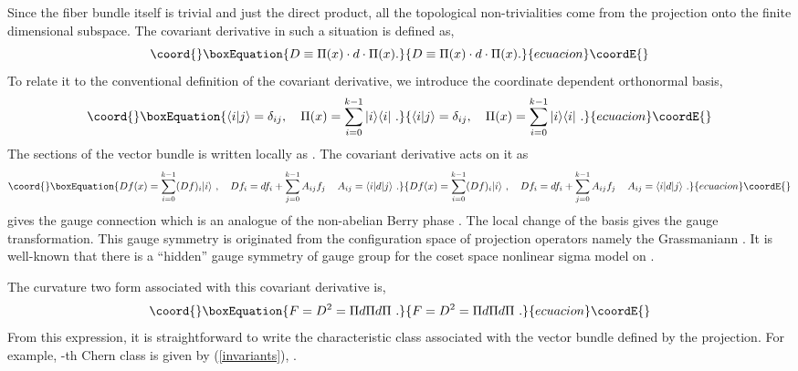 \documentclass[a4paper,12pt]{article}
\begin{document}
Since the fiber bundle
\coordHE{} itself is trivial and just the direct product,
all the topological non-trivialities come from the projection
onto the finite dimensional subspace.
The covariant derivative in such a situation is defined as,
\begin{equation}\coord{}\boxEquation{
 D \equiv \Pi(x) \cdot d\cdot \Pi(x).
}{
 D \equiv \Pi(x) \cdot d\cdot \Pi(x).
}{ecuacion}\coordE{}\end{equation}
To relate it to the conventional definition
of the covariant derivative, we introduce the coordinate
dependent orthonormal basis,
\begin{equation}\coord{}\boxEquation{
 \langle i |j \rangle =\delta_{ij},\quad
 \Pi(x) =\sum_{i=0}^{k-1} |i \rangle \langle i|\,\,.
}{
 \langle i |j \rangle =\delta_{ij},\quad
 \Pi(x) =\sum_{i=0}^{k-1} |i \rangle \langle i|\,\,.
}{ecuacion}\coordE{}\end{equation}
The sections of the vector bundle is written locally 
as \coordHE{}. 
The covariant derivative acts on it as
\begin{equation}\coord{}\boxEquation{
 D f(x) = \sum_{i=0}^{k-1} (Df)_i |i\rangle\,\,,\quad
 Df_i = df_i +\sum_{j=0}^{k-1}  A_{ij} f_j\,\quad
 A_{ij} = \langle i | d | j\rangle\,\,.
}{
 D f(x) = \sum_{i=0}^{k-1} (Df)_i |i\rangle\,\,,\quad
 Df_i = df_i +\sum_{j=0}^{k-1}  A_{ij} f_j\,\quad
 A_{ij} = \langle i | d | j\rangle\,\,.
}{ecuacion}\coordE{}\end{equation}
\coordHE{} gives the  \coordHE{} gauge connection
which is an analogue of the  non-abelian Berry phase \cite{r:Berry}.
The local change of the basis \coordHE{} gives the
gauge transformation.
This gauge symmetry is originated from
the configuration space of projection operators
namely the Grassmaniann \coordHE{}.
It is well-known that there is a ``hidden''
gauge symmetry of gauge group \coordHE{} for the 
coset space nonlinear sigma model on \coordHE{}.




The curvature two form associated with this covariant derivative
is,
\begin{equation}\coord{}\boxEquation{
 F=D^2 = \Pi d\Pi d \Pi\,\,.
}{
 F=D^2 = \Pi d\Pi d \Pi\,\,.
}{ecuacion}\coordE{}\end{equation}
{}From this expression, it is straightforward to write
the characteristic class associated with the vector 
bundle defined by the projection.
For example, \coordHE{}-th Chern class is given by (\ref{invariants}),
\coordHE{}.
\end{document}
